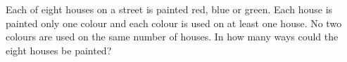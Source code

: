 Each of eight houses on a street is painted red, blue or green. Each house is painted only one colour and each colour is used on at least one house. No two colours are used on the same number of houses. In how many ways could the eight houses be painted?
